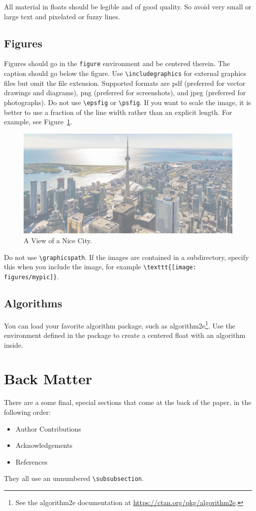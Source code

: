 \documentclass{uai2021} %
\begin{document}
All material in floats should be legible and of good quality.
So avoid very small or large text and pixelated or fuzzy lines.

\subsection{Figures}\label{sec:figures}
Figures should go in the \texttt{figure} environment and be centered therein.
The caption should go below the figure.
Use \verb|\includegraphics| for external graphics files but omit the file extension.
Supported formats are \textsf{pdf} (preferred for vector drawings and diagrams), \textsf{png} (preferred for screenshots), and \textsf{jpeg} (preferred for photographs).
Do not use \verb|\epsfig| or \verb|\psfig|.
If you want to scale the image, it is better to use a fraction of the line width rather than an explicit length.
For example, see Figure~\ref{fig:toronto}.
\begin{figure}
  \centering
  \includegraphics[width=0.7\linewidth,page=3]{toronto}
  \caption{A View of a Nice City.}\label{fig:toronto}
\end{figure}

Do not use \verb|\graphicspath|.
If the images are contained in a subdirectory, specify this when you include the image, for example \verb|\texttt{[image: figures/mypic]}|.


\subsection{Algorithms}\label{sec:algorithms}
You can load your favorite algorithm package, such as \textsf{algorithm2e}\footnote{See the \textsf{algorithm2e} documentation at \url{https://ctan.org/pkg/algorithm2e}.}.
Use the environment defined in the package to create a centered float with an algorithm inside.

\section{Back Matter}
There are a some final, special sections that come at the back of the paper, in the following order:
\begin{itemize}
  \item Author Contributions
  \item Acknowledgements
  \item References
\end{itemize}
They all use an unnumbered \verb|\subsubsection|.
\end{document}
